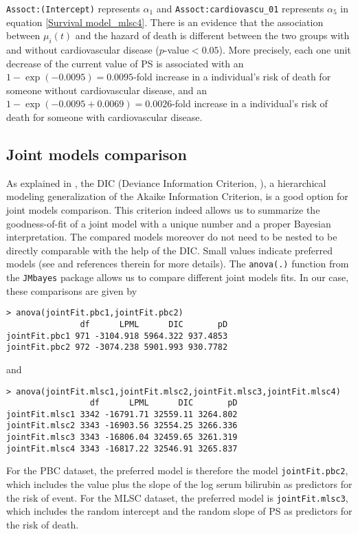 \documentclass[12pt]{article}
\begin{document}
\texttt{Assoct:(Intercept)} represents $\alpha_1$ and \texttt{Assoct:cardiovascu\_01} represents $\alpha_5$ in equation \eqref{Survival model_mlsc4}. There is an evidence that the
association between $\mu_i(t)$ and the hazard of death is different between the two groups with and without cardiovascular disease ($p$-value$<0.05$). More precisely, each one unit decrease of the current value of PS is associated with an $1-\exp(-0.0095) =  0.0095$-fold increase in a individual's risk of death for someone without cardiovascular disease, and an $1-\exp(-0.0095+0.0069) = 0.0026$-fold increase in a individual's risk of death for someone with cardiovascular disease.


\subsection{Joint models comparison}
\label{joint models comparison}
As explained in \cite{GuoCarlin}, the DIC (Deviance Information Criterion,  \cite{Spiegelhalter}), a hierarchical modeling generalization of the Akaike Information Criterion, is a good option for joint models comparison. This criterion indeed allows us to summarize the goodness-of-fit of a joint model with a unique number and a proper Bayesian interpretation. The compared models moreover do not need to be nested to be directly comparable with the help of the DIC. Small values indicate preferred models (see \cite{GuoCarlin} and references therein for more details). The \texttt{anova(.)} function from the \texttt{JMbayes} package allows us to compare different joint models fits. In our case, these comparisons are given by
\begin{verbatim}
> anova(jointFit.pbc1,jointFit.pbc2)
               df      LPML      DIC       pD
jointFit.pbc1 971 -3104.918 5964.322 937.4853
jointFit.pbc2 972 -3074.238 5901.993 930.7782
\end{verbatim}
and
\begin{verbatim}
> anova(jointFit.mlsc1,jointFit.mlsc2,jointFit.mlsc3,jointFit.mlsc4)
                 df      LPML      DIC       pD
jointFit.mlsc1 3342 -16791.71 32559.11 3264.802
jointFit.mlsc2 3343 -16903.56 32554.25 3266.336
jointFit.mlsc3 3343 -16806.04 32459.65 3261.319
jointFit.mlsc4 3343 -16817.22 32546.91 3265.837
\end{verbatim}
For the PBC dataset, the preferred model is therefore the model \texttt{jointFit.pbc2}, which includes the value plus the slope of the log serum bilirubin as predictors for the risk of event. For the MLSC dataset, the preferred model is \texttt{jointFit.mlsc3}, which includes the random intercept and the random slope of PS as predictors for the risk of death.
\end{document}
